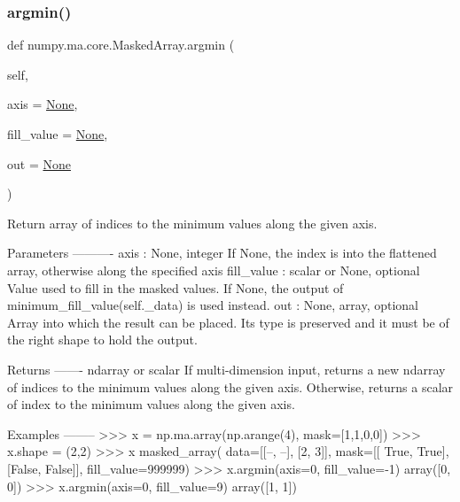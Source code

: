 \subsubsection{\texorpdfstring{argmin()}{argmin()}}
{\footnotesize\ttfamily def numpy.\+ma.\+core.\+Masked\+Array.\+argmin (\begin{DoxyParamCaption}\item[{}]{self,  }\item[{}]{axis = {\ttfamily \hyperlink{namespacenumpy_1_1ma_1_1core_a647ee1848dfa3692fe35a663a2aa40b3}{None}},  }\item[{}]{fill\+\_\+value = {\ttfamily \hyperlink{namespacenumpy_1_1ma_1_1core_a647ee1848dfa3692fe35a663a2aa40b3}{None}},  }\item[{}]{out = {\ttfamily \hyperlink{namespacenumpy_1_1ma_1_1core_a647ee1848dfa3692fe35a663a2aa40b3}{None}} }\end{DoxyParamCaption})}

\begin{DoxyVerb}Return array of indices to the minimum values along the given axis.

Parameters
----------
axis : {None, integer}
    If None, the index is into the flattened array, otherwise along
    the specified axis
fill_value : scalar or None, optional
    Value used to fill in the masked values.  If None, the output of
    minimum_fill_value(self._data) is used instead.
out : {None, array}, optional
    Array into which the result can be placed. Its type is preserved
    and it must be of the right shape to hold the output.

Returns
-------
ndarray or scalar
    If multi-dimension input, returns a new ndarray of indices to the
    minimum values along the given axis.  Otherwise, returns a scalar
    of index to the minimum values along the given axis.

Examples
--------
>>> x = np.ma.array(np.arange(4), mask=[1,1,0,0])
>>> x.shape = (2,2)
>>> x
masked_array(
  data=[[--, --],
[2, 3]],
  mask=[[ True,  True],
[False, False]],
  fill_value=999999)
>>> x.argmin(axis=0, fill_value=-1)
array([0, 0])
>>> x.argmin(axis=0, fill_value=9)
array([1, 1])\end{DoxyVerb}
 \mbox{\label{classnumpy_1_1ma_1_1core_1_1MaskedArray_a69a1a85b23db3297f1c2ceb38d4c95af}} 
